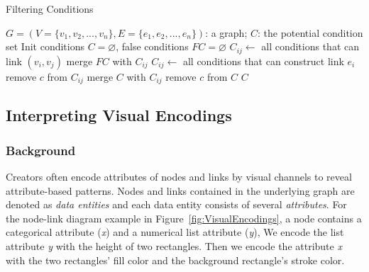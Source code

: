 \begin{algorithm}[!t]
    \renewcommand\arraystretch{1.2}
    \caption{ Filtering Conditions }
    \label{alg:conditions}
    \begin{algorithmic}[1]
        \Require
            $G=(V=\{v_1, v_2, ..., v_n\}, E=\{e_1, e_2, ..., e_n\})$: a graph;
        \Ensure
            $C$: the potential condition set
        \State Init conditions $C=\varnothing$, false conditions $FC=\varnothing$
                \State $C_{ij} \gets$ all conditions that can link $(v_i, v_j)$
                \State merge $FC$ with $C_{ij}$
            \EndIf
        \EndFor
            \State $C_{ij} \gets$ all conditions that can construct link $e_i$
                    \State remove $c$ from $C_{ij}$
                \EndIf
            \EndFor
            \State merge $C$ with $C_{ij}$
        \EndFor
                \State remove $c$ from $C$
            \EndIf
        \EndFor
        \State \Return $C$
    \end{algorithmic}
\end{algorithm}


\subsection{Interpreting Visual Encodings}\label{sec:visualencodings}
\subsubsection{Background}
Creators often encode attributes of nodes and links by visual channels to reveal attribute-based patterns.
Nodes and links contained in the underlying graph are denoted as \textit{data entities} and each data entity consists of several \textit{attributes}.
For the node-link diagram example in Figure~\ref{fig:VisualEncodings}, a node contains a categorical attribute (\textit{x}) and a numerical list attribute (\textit{y}), We encode the list attribute \textit{y} with the height of two rectangles.
Then we encode the attribute \textit{x} with the two rectangles' fill color and the background rectangle's stroke color.

